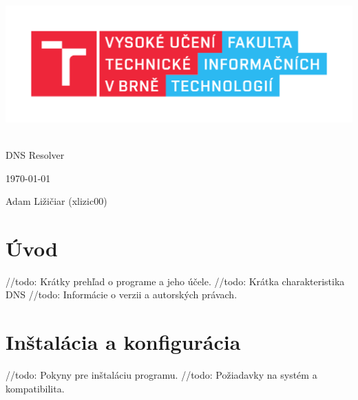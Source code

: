 \documentclass[a4paper, 11pt]{article}
\begin{document}
	\begin{titlepage}
		\begin{center}
			\includegraphics[width=0.77\linewidth]{res/logo_FIT.pdf} \\


			 \\
			\LARGE{DNS Resolver} \\
		\end{center}

		\begin{minipage}[b]{0.4 \textwidth}
			\raggedright
			{\Large \today}
		\end{minipage}
		\hfill
		\begin{minipage}[b]{0.6 \textwidth}
			\raggedleft
			\Large
			Adam Ližičiar (xlizic00)\\
		\end{minipage}		
	\end{titlepage}

	\setcounter{page}{1}
	\tableofcontents
	\clearpage

	\setcounter{page}{1}
	
	\section{Úvod}
	//todo: Krátky prehľad o programe a jeho účele.
	//todo: Krátka charakteristika DNS
	//todo: Informácie o verzii a autorských právach.

	\section{Inštalácia a konfigurácia}
	//todo: Pokyny pre inštaláciu programu.
	//todo: Požiadavky na systém a kompatibilita.
	
\end{document}
